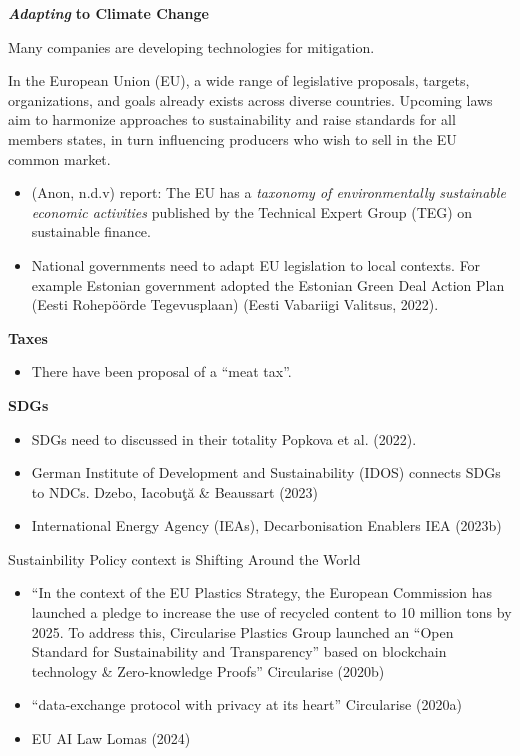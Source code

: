 \documentclass[
  letterpaper,
  DIV=11,
  numbers=noendperiod]{scrartcl}
\providecommand{\tightlist}{%
  \setlength{\itemsep}{0pt}\setlength{\parskip}{0pt}}\usepackage{longtable,booktabs,array}
\begin{document}
\textbf{\emph{Adapting}} \textbf{to Climate Change}

Many companies are developing technologies for mitigation.

In the European Union (EU), a wide range of legislative proposals,
targets, organizations, and goals already exists across diverse
countries. Upcoming laws aim to harmonize approaches to sustainability
and raise standards for all members states, in turn influencing
producers who wish to sell in the EU common market.

\begin{itemize}
\tightlist
\item
  (Anon, n.d.v) report: The EU has a \emph{taxonomy of environmentally
  sustainable economic activities} published by the Technical Expert
  Group (TEG) on sustainable finance.
\item
  National governments need to adapt EU legislation to local contexts.
  For example Estonian government adopted the Estonian Green Deal Action
  Plan (Eesti Rohepöörde Tegevusplaan) (Eesti Vabariigi Valitsus, 2022).
\end{itemize}

\textbf{Taxes}

\begin{itemize}
\tightlist
\item
  There have been proposal of a ``meat tax''.
\end{itemize}

\textbf{SDGs}

\begin{itemize}
\item
  SDGs need to discussed in their totality Popkova et al. (2022).
\item
  German Institute of Development and Sustainability (IDOS) connects
  SDGs to NDCs. Dzebo, Iacobuţă \& Beaussart (2023)
\item
  International Energy Agency (IEAs), Decarbonisation Enablers IEA
  (2023b)
\end{itemize}

Sustainbility Policy context is Shifting Around the World

\begin{itemize}
\item
  ``In the context of the EU Plastics Strategy, the European Commission
  has launched a pledge to increase the use of recycled content to 10
  million tons by 2025. To address this, Circularise Plastics Group
  launched an ``Open Standard for Sustainability and Transparency''
  based on blockchain technology \& Zero-knowledge Proofs'' Circularise
  (2020b)
\item
  ``data-exchange protocol with privacy at its heart'' Circularise
  (2020a)
\item
  EU AI Law Lomas (2024)
\end{itemize}
\end{document}
